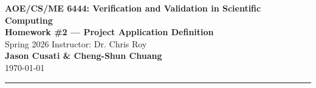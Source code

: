\documentclass[12pt, letterpaper]{article}
\begin{document}
\begin{center}
  {\large\textbf{AOE/CS/ME 6444: Verification and Validation in Scientific Computing}}\\[4pt]
  {\large\textbf{Homework \#2 --- Project Application Definition}}\\[4pt]
  Spring 2026 \quad Instructor: Dr. Chris Roy\\[6pt]
  \textbf{Jason Cusati \& Cheng-Shun Chuang}\\[2pt]
  \today
\end{center}

\hrule
\vspace{12pt}






\end{document}
